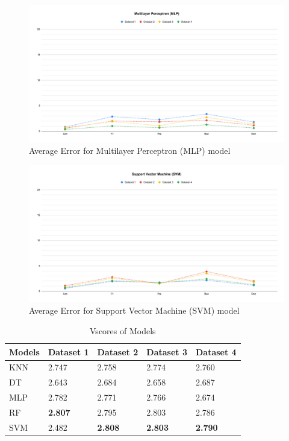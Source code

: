 \documentclass[a4paper,fleqn]{cas-dc}
\newcommand{\rowstyle}[1]{\gdef\currentrowstyle{#1}#1\ignorespaces}  %
\newcommand{\bfrow}{\rowstyle{\bfseries}}  %
\newcommand{\responsemod}{\color{blue}}
\begin{document}
\begin{figure}[ht]
    \centering
    \includegraphics[width=1.9\columnwidth]{delta_MLP.pdf}
    \caption{Average Error for Multilayer Perceptron (MLP) model} \label{fig:perfromance_delta_mlp}
\end{figure}

\begin{figure}[ht]
    \centering
    \includegraphics[width=1.9\columnwidth]{delta_SVM.pdf}
    \caption{Average Error for Support Vector Machine (SVM) model} \label{fig:perfromance_delta_svm}
\end{figure}

\clearpage
\begin{table}[H]
    {\responsemod
        \caption{Vscores of Models}\label{tab:vscores_models}
        \begin{tabular*}{\tblwidth}{@{}FKKKK@{}}
            \toprule
            \bfrow Models & Dataset 1 & Dataset 2 & Dataset 3 & Dataset 4 \\
            \midrule
            KNN & 2.747 & 2.758 & 2.774 & 2.760 \\
            DT & 2.643 & 2.684 & 2.658 & 2.687 \\
            MLP & 2.782 & 2.771 & 2.766 & 2.674 \\
            RF & \textbf{2.807} & 2.795 & 2.803 & 2.786 \\
            SVM & 2.482 & \textbf{2.808} & \textbf{2.803} & \textbf{2.790} \\
            \bottomrule
        \end{tabular*}
    }
\end{table}
\end{document}
